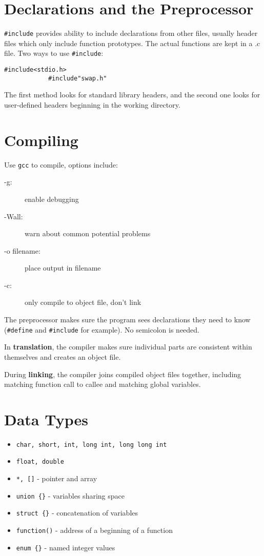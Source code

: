 \documentclass[11pt]{article}
\begin{document}
\section{Declarations and the Preprocessor}
	\verb|#include| provides ability to include declarations from other files, usually header files which only include function prototypes. The actual functions are kept in a .c file.
	Two ways to use \verb|#include|: 
		\begin{lstlisting}[autogobble=true]
			#include<stdio.h>
			#include"swap.h"
		\end{lstlisting}
	The first method looks for standard library headers, and the second one looks for user-defined headers beginning in the working directory.
	
\section{Compiling}
	Use \verb|gcc| to compile, options include:
	\begin{description}
		\item[-g:] enable debugging
		\item[-Wall:] warn about common potential problems
		\item[-o filename:] place output in filename
		\item[-c:] only compile to object file, don't link
	\end{description}
	
	The preprocessor makes sure the program sees declarations they need to know (\verb|#define| and \verb|#include| for example). No semicolon is needed.
	
	In \textbf{translation}, the compiler makes sure individual parts are consistent within themselves and creates an object file.
	
	During \textbf{linking}, the compiler joins compiled object files together, including matching function call to callee and matching global variables.
	
\section{Data Types}
	\begin{itemize}
		\parskip=-1pt
		\item \verb|char, short, int, long int, long long int|
		\item \verb|float, double|
		\item \verb|*, []| - pointer and array
		\item \verb|union {}| - variables sharing space
		\item \verb|struct {}| - concatenation of variables
		\item \verb|function()| - address of a beginning of a function
		\item \verb|enum {}| - named integer values
	\end{itemize}
	
\end{document}

